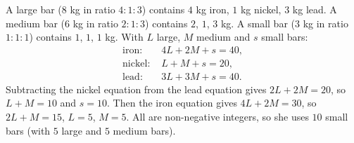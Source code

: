 A large bar ($8$ kg in ratio $4:1:3$) contains $4$ kg iron, $1$ kg nickel, $3$ kg lead. A medium bar ($6$ kg in ratio $2:1:3$) contains $2$, $1$, $3$ kg. A small bar ($3$ kg in ratio $1:1:1$) contains $1$, $1$, $1$ kg. With $L$ large, $M$ medium and $s$ small bars:
\[
\begin{aligned}
\text{iron: }&4L+2M+s=40,\\
\text{nickel: }&L+M+s=20,\\
\text{lead: }&3L+3M+s=40.
\end{aligned}
\]
Subtracting the nickel equation from the lead equation gives $2L+2M=20$, so $L+M=10$ and $s=10$. Then the iron equation gives $4L+2M=30$, so $2L+M=15$, $L=5$, $M=5$. All are non-negative integers, so she uses $\boxed{10}$ small bars (with $5$ large and $5$ medium bars).
